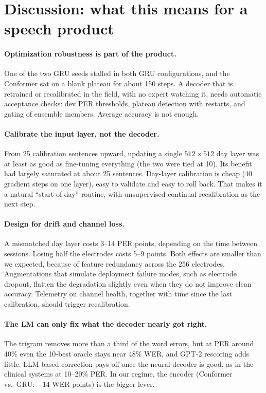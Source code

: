 \section{Discussion: what this means for a speech product}
\label{sec:discussion}

\paragraph{Optimization robustness is part of the product.} One of the two GRU seeds stalled in both GRU configurations, and the Conformer sat on a blank plateau for about 150 steps. A decoder that is retrained or recalibrated in the field, with no expert watching it, needs automatic acceptance checks: dev PER thresholds, plateau detection with restarts, and gating of ensemble members. Average accuracy is not enough.

\paragraph{Calibrate the input layer, not the decoder.} From 25 calibration sentences upward, updating a single $512\times512$ day layer was at least as good as fine-tuning everything (the two were tied at 10). Its benefit had largely saturated at about 25 sentences. Day-layer calibration is cheap (40 gradient steps on one layer), easy to validate and easy to roll back. That makes it a natural ``start of day'' routine, with unsupervised continual recalibration \citep{fan2023plug} as the next step.

\paragraph{Design for drift and channel loss.} A mismatched day layer costs 3--14 PER points, depending on the time between sessions. Losing half the electrodes costs 5--9 points. Both effects are smaller than we expected, because of feature redundancy across the 256 electrodes. Augmentations that simulate deployment failure modes, such as electrode dropout, flatten the degradation slightly even when they do not improve clean accuracy. Telemetry on channel health, together with time since the last calibration, should trigger recalibration.

\paragraph{The LM can only fix what the decoder nearly got right.} The trigram removes more than a third of the word errors, but at PER around 40\% even the 10-best oracle stays near 48\% WER, and GPT-2 rescoring adds little. LLM-based correction pays off once the neural decoder is good, as in the clinical systems at 10--20\% PER. In our regime, the encoder (Conformer vs.\ GRU: $-$14 WER points) is the bigger lever.


